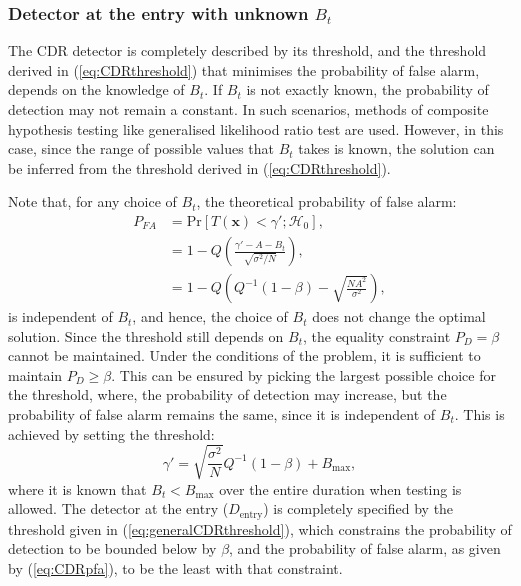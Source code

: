 \documentclass[11pt]{article}
\newcommand{\bx}{\mathbf{x}}
\newcommand{\cH}{\mathcal{H}}
\newcommand{\Prob}{\mathrm{Pr}}
\begin{document}
\subsubsection{Detector at the entry with unknown $B_{t}$}
\label{subsubsec:entryDetectorGeneralised}

The CDR detector is completely described by its threshold, and the threshold derived in (\ref{eq:CDRthreshold}) that minimises the probability of false alarm, depends on the knowledge of $B_{t}$. If $B_{t}$ is not exactly known, the probability of detection may not remain a constant. In such scenarios, methods of composite hypothesis testing like generalised likelihood ratio test are used. However, in this case, since the range of possible values that $B_{t}$ takes is known, the solution can be inferred from the threshold derived in (\ref{eq:CDRthreshold}).

Note that, for any choice of $B_{t}$, the theoretical probability of false alarm:
\begin{equation}
\begin{split}
	P_{FA} &= \Prob[T(\bx) < \gamma';\cH_{0}], \\
	&= 1-Q\left( \frac{\gamma'-A-B_{t}}{\sqrt{\sigma^{2}/N}} \right), \\
	&= 1-Q\left( Q^{-1}(1-\beta) -\sqrt{\frac{NA^{2}}{\sigma^{2}}} \right),
\end{split}
\label{eq:CDRpfa}
\end{equation}
is independent of $B_{t}$, and hence, the choice of $B_{t}$ does not change the optimal solution. Since the threshold still depends on $B_{t}$, the equality constraint $P_{D}=\beta$ cannot be maintained. Under the conditions of the problem, it is sufficient to maintain $P_{D} \geq \beta$. This can be ensured by picking the largest possible choice for the threshold, where, the probability of detection may increase, but the probability of false alarm remains the same, since it is independent of $B_{t}$. This is achieved by setting the threshold:
\begin{equation}
	\gamma' = \sqrt{\frac{\sigma^{2}}{N}} Q^{-1}(1-\beta) + B_{\text{max}},
\label{eq:generalCDRthreshold}
\end{equation}
where it is known that $B_{t}<B_{\text{max}}$ over the entire duration when testing is allowed. The detector at the entry ($D_{\text{entry}}$) is completely specified by the threshold given in (\ref{eq:generalCDRthreshold}), which constrains the probability of detection to be bounded below by $\beta$, and the probability of false alarm, as given by (\ref{eq:CDRpfa}), to be the least with that constraint.
\end{document}
